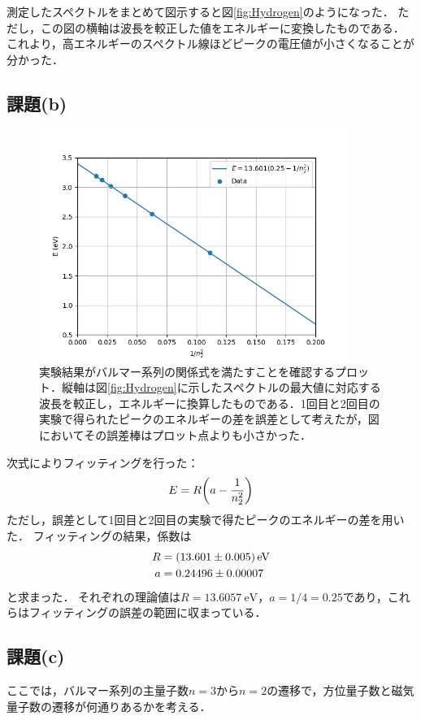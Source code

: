 \documentclass[titlepage]{jsarticle}
\begin{document}
測定したスペクトルをまとめて図示すると図\ref{fig:Hydrogen}のようになった．
ただし，この図の横軸は波長を較正した値をエネルギーに変換したものである．
これより，高エネルギーのスペクトル線ほどピークの電圧値が小さくなることが分かった．

\subsection{課題(b)}

\begin{figure}[htbp]
  \centering
  \includegraphics[width=10cm]{balmer_check.png}
  \caption{実験結果がバルマー系列の関係式を満たすことを確認するプロット．縦軸は図\ref{fig:Hydrogen}に示したスペクトルの最大値に対応する波長を較正し，エネルギーに換算したものである．1回目と2回目の実験で得られたピークのエネルギーの差を誤差として考えたが，図においてその誤差棒はプロット点よりも小さかった．}
  \label{fig:balmer_check}
\end{figure}

次式によりフィッティングを行った：
\begin{equation}
  E = R\qty(a - \frac{1}{n_2^2})
\end{equation}
ただし，誤差として1回目と2回目の実験で得たピークのエネルギーの差を用いた．
フィッティングの結果，係数は
\begin{align}
  R &= \SI[separate-uncertainty]{13.601\pm 0.005}{\eV}\\
  a &= 0.24496 \pm 0.00007
\end{align}
と求まった．
それぞれの理論値は$R=\SI{13.6057}{\eV}$，$a=1/4=0.25$であり，これらはフィッティングの誤差の範囲に収まっている．

\subsection{課題(c)}
ここでは，バルマー系列の主量子数$n=3$から$n=2$の遷移で，方位量子数と磁気量子数の遷移が何通りあるかを考える．
\end{document}
